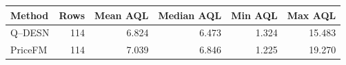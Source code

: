 \begin{tabular}{lrrrrr}
\toprule
Method & Rows & Mean AQL & Median AQL & Min AQL & Max AQL \\
\midrule
Q--DESN & 114 & 6.824 & 6.473 & 1.324 & 15.483 \\
PriceFM & 114 & 7.039 & 6.846 & 1.225 & 19.270 \\
\bottomrule
\end{tabular}
